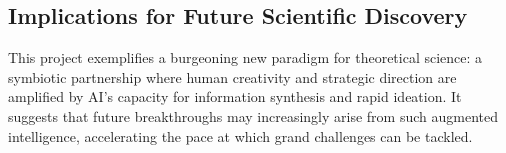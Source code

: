 \documentclass[11pt,a4paper]{article}
\begin{document}
\subsection{Implications for Future Scientific Discovery}
This project exemplifies a burgeoning new paradigm for theoretical science: a symbiotic partnership where human creativity and strategic direction are amplified by AI’s capacity for information synthesis and rapid ideation. It suggests that future breakthroughs may increasingly arise from such augmented intelligence, accelerating the pace at which grand challenges can be tackled.
\end{document}
